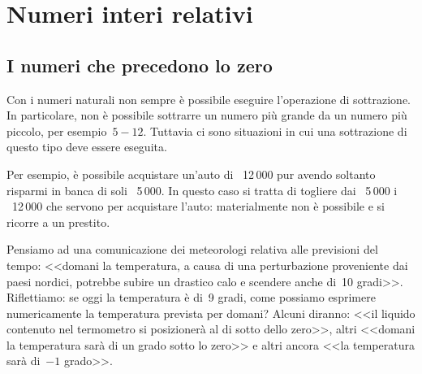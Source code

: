 


\chapter{Numeri interi relativi}


\section{I numeri che precedono lo zero}
\label{sec:int_negativi}

Con i numeri naturali non sempre è possibile eseguire l'operazione di 
sottrazione. 
In particolare, non è possibile sottrarre un numero più grande da un numero 
più piccolo, per esempio~\(5-12\). 
Tuttavia ci sono situazioni in cui una sottrazione di questo tipo deve essere 
eseguita.

Per esempio, è possibile acquistare un'auto di \officialeuro\ 12\,000 pur 
avendo soltanto risparmi in banca di soli \officialeuro\ 5\,000. 
In questo caso si tratta di togliere dai \officialeuro\ 
5\,000 i \officialeuro\ 12\,000 che servono per acquistare 
l'auto: materialmente non è possibile e si ricorre a un prestito.

Pensiamo ad una comunicazione dei meteorologi relativa alle previsioni del 
tempo: <<domani la temperatura, a causa di una perturbazione proveniente dai 
paesi nordici, potrebbe subire un drastico calo e scendere anche di~10 
gradi>>. 
Riflettiamo: se oggi la temperatura è di~9 gradi, come possiamo esprimere 
numericamente la temperatura prevista per domani? 
Alcuni diranno: <<il liquido contenuto nel termometro si posizionerà al di 
sotto dello zero>>,
altri <<domani la temperatura sarà di un grado sotto lo zero>> e
altri ancora <<la temperatura sarà di~\(-1\) grado>>.


